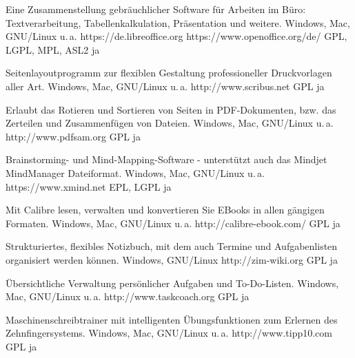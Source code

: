 





{Eine Zusammenstellung gebräuchlicher Software für Arbeiten im Büro: Textverarbeitung, Tabellenkalkulation, Präsentation und weitere.}
{Windows, Mac, GNU/Linux u.\,a.}
{https://de.libreoffice.org https://www.openoffice.org/de/}
{GPL, LGPL, MPL, ASL2}
{ja}

{Seitenlayoutprogramm zur flexiblen Gestaltung professioneller Druckvorlagen aller Art.}
{Windows, Mac, GNU/Linux u.\,a.}
{http://www.scribus.net}
{GPL}
{ja}

{Erlaubt das Rotieren und Sortieren von Seiten in PDF-Dokumenten, bzw. das Zerteilen und Zusammenfügen von Dateien.}
{Windows, Mac, GNU/Linux u.\,a.}
{http://www.pdfsam.org}
{GPL}
{ja}

{Brainstorming- und Mind-Mapping-Software - unterstützt auch das Mindjet MindManager Dateiformat.}
{Windows, Mac, GNU/Linux u.\,a.}
{https://www.xmind.net}
{EPL, LGPL}
{ja}

{Mit Calibre lesen, verwalten und konvertieren Sie EBooks in allen gängigen Formaten.}
{Windows, Mac, GNU/Linux u.\,a.}
{http://calibre-ebook.com/}
{GPL}
{ja}

{Strukturiertes, flexibles Notizbuch, mit dem auch Termine und Aufgabenlisten organisiert werden können.}
{Windows, GNU/Linux}
{http://zim-wiki.org}
{GPL}
{ja}

{Übersichtliche Verwaltung persönlicher Aufgaben und To-Do-Listen.}
{Windows, Mac, GNU/Linux u.\,a.}
{http://www.taskcoach.org}
{GPL}
{ja}


{Maschinenschreibtrainer mit intelligenten Übungsfunktionen zum Erlernen des Zehnfingersystems.}
{Windows, Mac, GNU/Linux u.\,a.}
{http://www.tipp10.com}
{GPL}
{ja}

\backpage


